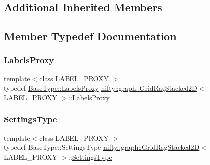 \subsection*{Additional Inherited Members}


\subsection{Member Typedef Documentation}
\mbox{\label{classnifty_1_1graph_1_1GridRagStacked2D_a09b44c819b97274a1025dc68cb6b3dc9}} 
\subsubsection{\texorpdfstring{Labels\+Proxy}{LabelsProxy}}
{\footnotesize\ttfamily template$<$class L\+A\+B\+E\+L\+\_\+\+P\+R\+O\+XY $>$ \\
typedef \hyperlink{classnifty_1_1graph_1_1GridRag_ad3146f72301da4f45b51e3b692776cf1}{Base\+Type\+::\+Labels\+Proxy} \hyperlink{classnifty_1_1graph_1_1GridRagStacked2D}{nifty\+::graph\+::\+Grid\+Rag\+Stacked2D}$<$ L\+A\+B\+E\+L\+\_\+\+P\+R\+O\+XY $>$\+::\hyperlink{classnifty_1_1graph_1_1GridRagStacked2D_a09b44c819b97274a1025dc68cb6b3dc9}{Labels\+Proxy}}

\mbox{\label{classnifty_1_1graph_1_1GridRagStacked2D_abc778dc9bd7c20bacba215c1fc64ffb5}} 
\subsubsection{\texorpdfstring{Settings\+Type}{SettingsType}}
{\footnotesize\ttfamily template$<$class L\+A\+B\+E\+L\+\_\+\+P\+R\+O\+XY $>$ \\
typedef Base\+Type\+::\+Settings\+Type \hyperlink{classnifty_1_1graph_1_1GridRagStacked2D}{nifty\+::graph\+::\+Grid\+Rag\+Stacked2D}$<$ L\+A\+B\+E\+L\+\_\+\+P\+R\+O\+XY $>$\+::\hyperlink{classnifty_1_1graph_1_1GridRagStacked2D_abc778dc9bd7c20bacba215c1fc64ffb5}{Settings\+Type}}



